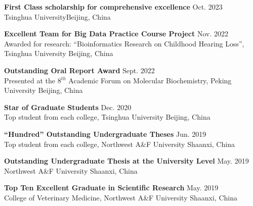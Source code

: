 \textbf{First Class scholarship for comprehensive excellence} \hfill Oct. 2023 \\
{\small Tsinghua University\hfill  Beijing, China}

\vspace{4pt}

\textbf{Excellent Team for Big Data Practice Course Project} \hfill Nov. 2022 \\
{\small Awarded for research: ``Bioinformatics Research on Childhood Hearing Loss'', Tsinghua University \hfill Beijing, China}

\vspace{4pt}

\textbf{Outstanding Oral Report Award} \hfill Sept. 2022 \\
{\small Presented at the 8$^{th}$ Academic Forum on Molecular Biochemistry, Peking University \hfill Beijing, China}

\vspace{4pt}


\vspace{4pt}

\textbf{Star of Graduate Students} \hfill Dec. 2020 \\
{\small Top student from each college, Tsinghua University \hfill Beijing, China}

\vspace{4pt}

\textbf{``Hundred'' Outstanding Undergraduate Theses} \hfill Jun. 2019 \\
{\small Top student from each college, Northwest A\&F University \hfill Shaanxi, China}

\vspace{4pt}

\textbf{Outstanding Undergraduate Thesis at the University Level} \hfill May. 2019 \\
{\small Northwest A\&F University \hfill Shaanxi, China}

\vspace{4pt}

\textbf{Top Ten Excellent Graduate in Scientific Research} \hfill May. 2019 \\
{\small College of Veterinary Medicine, Northwest A\&F University \hfill Shaanxi, China}

\vspace{4pt}

